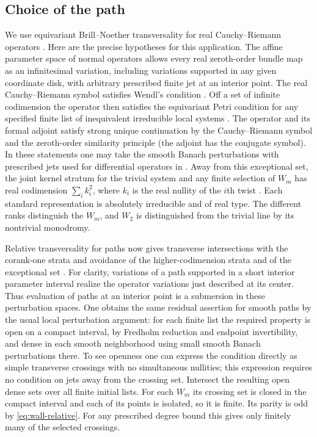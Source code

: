 \subsection*{Choice of the path}
We use equivariant Brill--Noether transversality for real
Cauchy--Riemann operators \cite{wendl,dwbn}. Here are the precise
hypotheses for this application. The affine parameter space of normal
operators allows every real zeroth-order bundle map as an infinitesimal
variation, including variations supported in any given coordinate
disk, with arbitrary prescribed finite jet at an interior point.
The real Cauchy--Riemann symbol satisfies Wendl's condition
\cite[Theorem~2.5.3]{dwbn}. Off a set of infinite codimension the
operator then satisfies the equivariant Petri condition for any
specified finite list of inequivalent irreducible local systems
\cite[Proposition~1.6.6 and Theorem~1.6.17]{dwbn}. The operator and
its formal adjoint satisfy strong unique continuation by the
Cauchy--Riemann symbol and the zeroth-order similarity principle
(the adjoint has the conjugate symbol). In these statements
one may take the smooth Banach perturbations with prescribed jets
used for differential operators in \cite[Sections~2.2--2.3]{dwbn}.
Away from this exceptional set, the joint kernel stratum for the
trivial system and any finite selection of $W_m$ has real codimension
$\sum_i k_i^2$, where $k_i$ is the real nullity of the $i$th twist
\cite[Theorem~1.3.5 and Proposition~1.3.11]{dwbn}. Each standard representation is absolutely
irreducible and of real type. The different ranks distinguish the
$W_m$, and $W_2$ is distinguished from the trivial line by its
nontrivial monodromy.

Relative transversality for paths now gives transverse intersections
with the corank-one strata and avoidance of the higher-codimension
strata and of the exceptional set \cite[Proposition~1.B.5]{dwbn}. For clarity, variations of a path
supported in a short interior parameter interval realize the operator
variations just described at its center. Thus evaluation of paths
at an interior point is a submersion in these perturbation spaces.
One obtains the same residual assertion for smooth paths by the
usual local perturbation argument: for each finite list the required
property is open on a compact interval, by Fredholm reduction and
endpoint invertibility, and dense in each smooth neighborhood using
small smooth Banach perturbations there. To see openness one can
express the condition directly as simple transverse crossings with
no simultaneous nullities; this expression requires no condition on
jets away from the crossing set. Intersect the resulting open dense
sets over all finite initial lists. For each $W_m$ its crossing set
is closed in the compact interval and each of its points is isolated,
so it is finite. Its parity is odd by \eqref{eq:wall-relative}.
For any prescribed degree bound this gives only finitely many of the
selected crossings.

